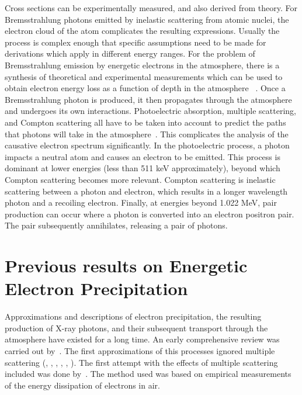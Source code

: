 Cross sections can be experimentally measured, and also derived from theory. For Bremsstrahlung photons emitted by inelastic scattering from atomic nuclei, the electron cloud of the atom complicates the resulting expressions. Usually the process is complex enough that specific assumptions need to be made for derivations which apply in different energy ranges. For the problem of Bremsstrahlung emission by energetic electrons in the atmosphere, there is a synthesis of theoretical and experimental measurements which can be used to obtain electron energy loss as a function of depth in the atmosphere~ \citep{Berger1972}. Once a Bremsstrahlung photon is produced, it then propagates through the atmosphere and undergoes its own interactions. Photoelectric absorption, multiple scattering, and Compton scattering all have to be taken into account to predict the paths that photons will take in the atmosphere~\citep{Berger1972}. This complicates the analysis of the causative electron spectrum significantly. In the photoelectric process, a photon impacts a neutral atom and causes an electron to be emitted. This process is dominant at lower energies (less than 511 keV approximately), beyond which Compton scattering becomes more relevant. Compton scattering is inelastic scattering between a photon and electron, which results in a longer wavelength photon and a recoiling electron. Finally, at energies beyond 1.022 MeV, pair production can occur where a photon is converted into an electron positron pair. The pair subsequently annihilates, releasing a pair of photons. 

\section{Previous results on Energetic Electron Precipitation}

Approximations and descriptions of electron precipitation, the resulting production of X-ray photons, and their subsequent transport through the atmosphere have existed for a long time. An early comprehensive review was carried out by~\citet{Brown1966a}. The first approximations of this processes ignored multiple scattering (\citet{Anderson1960}, \citet{Brown1965}, \citet{Christensen1970}, \citet{Barcus1966}, \citet{KAMIYAMA1966}, \citet{Polk1965}). The first attempt with the effects of multiple scattering included was done by~\citet{Rees1963}. The method used was based on empirical measurements of the energy dissipation of electrons in air.

